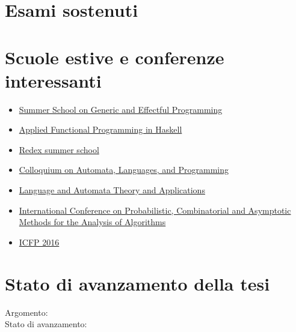 \documentclass[11pt]{article}
\begin{document}
\section*{Esami sostenuti}

\begin{description}

\item[%
] 

\item[%
] 

\end{description}

\section*{Scuole estive e conferenze interessanti}

\begin{itemize}
    \item \href{https://www.cs.ox.ac.uk/projects/utgp/school/index.html}
        {Summer School on Generic and Effectful Programming}
    \item \href{http://www.utrechtsummerschool.nl/courses/science/applied-functional-programming-in-haskell}
        {Applied Functional Programming in Haskell}
    \item \href{http://redex.racket-lang.org/summer-school.html}{Redex summer school}
    \item \href{http://www.easyconferences.eu/icalp2016/}{Colloquium on Automata, Languages, and Programming}
    \item \href{http://grammars.grlmc.com/LATA2016/}{Language and Automata Theory and Applications}
    \item \href{http://www.aofa2016.meetings.pl/}{International Conference on Probabilistic, Combinatorial and Asymptotic Methods 
    for the Analysis of Algorithms}
    \item \href{http://conf.researchr.org/home/icfp-2016}{ICFP 2016}
\end{itemize}


\section*{Stato di avanzamento della tesi}

\begin{description}

\item[Argomento:] 

\item[Stato di avanzamento:] 

\end{description}
\end{document}
